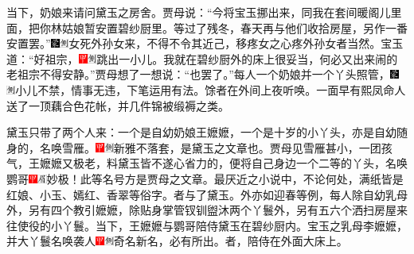 {当下，奶娘来请问黛玉之房舍。贾母说：“今将宝玉挪出来，同我在套间暖阁儿里面，把你林姑娘暂安置碧纱厨里。等过了残冬，春天再与他们收拾房屋，另作一番安置罢。”{\includegraphics[width=3mm]{../Images/00006}\includegraphics[width=3mm]{../Images/00011}\footnotesize \kaishu 女死外孙女来，不得不令其近己，移疼女之心疼外孙女者当然。}宝玉道：“好祖宗，{\includegraphics[width=3mm]{../Images/00002}\includegraphics[width=3mm]{../Images/00011}\footnotesize \kaishu 跳出一小儿。}我就在碧纱厨外的床上很妥当，何必又出来闹的老祖宗不得安静。”贾母想了一想说：“也罢了。”每人一个奶娘并一个丫头照管，{\includegraphics[width=3mm]{../Images/00006}\includegraphics[width=3mm]{../Images/00011}\footnotesize \kaishu 小儿不禁，情事无违，下笔运用有法。}馀者在外间上夜听唤。一面早有熙凤命人送了一顶藕合色花帐，并几件锦被缎褥之类。

黛玉只带了两个人来：一个是自幼奶娘王嬷嬷，一个是十岁的小丫头，亦是自幼随身的，名唤雪雁。{\includegraphics[width=3mm]{../Images/00002}\includegraphics[width=3mm]{../Images/00011}\footnotesize \kaishu 新雅不落套，是黛玉之文章也。}贾母见雪雁甚小，一团孩气，王嬷嬷又极老，料黛玉皆不遂心省力的，便将自己身边一个二等的丫头，名唤鹦哥{\includegraphics[width=3mm]{../Images/00002}\includegraphics[width=3mm]{../Images/00010}\footnotesize \kaishu 妙极！此等名号方是贾母之文章。最厌近之小说中，不论何处，满纸皆是红娘、小玉、嫣红、香翠等俗字。}者与了黛玉。外亦如迎春等例，每人除自幼乳母外，另有四个教引嬷嬷，除贴身掌管钗钏盥沐两个丫鬟外，另有五六个洒扫房屋来往使役的小丫鬟。当下，王嬷嬷与鹦哥陪侍黛玉在碧纱厨内。宝玉之乳母李嬷嬷，并大丫鬟名唤袭人{\includegraphics[width=3mm]{../Images/00002}\includegraphics[width=3mm]{../Images/00011}\footnotesize \kaishu 奇名新名，必有所出。}者，陪侍在外面大床上。

}
